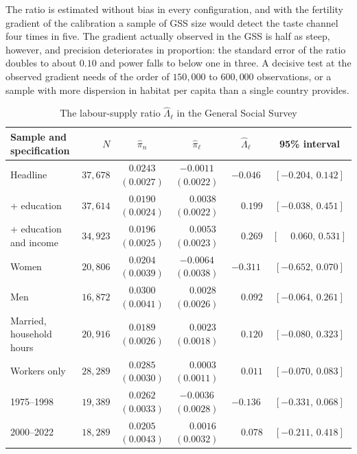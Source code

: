 \documentclass[11pt]{article}
\begin{document}
The ratio is estimated without bias in every configuration, and with the fertility gradient of the
calibration a sample of GSS size would detect the taste channel four times in five. The gradient
actually observed in the GSS is half as steep, however, and precision deteriorates in proportion:
the standard error of the ratio doubles to about $0.10$ and power falls to below one in three. A
decisive test at the observed gradient needs of the order of $150{,}000$ to $600{,}000$ observations, or a sample
with more dispersion in habitat per capita than a single country provides.

\begin{table}[h!]\centering
\begin{threeparttable}
\caption{The labour-supply ratio $\widehat\Lambda_\ell$ in the General Social Survey}
\label{tab:gss}
\footnotesize\setlength{\tabcolsep}{3.5pt}
\begin{tabular}{lrcccc}
\toprule
Sample and specification & $N$ & $\hat\pi_n$ & $\hat\pi_\ell$ & $\widehat\Lambda_\ell$ & 95\% interval\\
\midrule
Headline                              & $37{,}678$ & $0.0243$ $(0.0027)$ & $-0.0011$ $(0.0022)$ & $-0.046$ & $[-0.204,\,0.142]$\\
\quad + education                     & $37{,}614$ & $0.0190$ $(0.0024)$ & $\phantom{-}0.0038$ $(0.0022)$ & $\phantom{-}0.199$ & $[-0.038,\,0.451]$\\
\quad + education and income          & $34{,}923$ & $0.0196$ $(0.0025)$ & $\phantom{-}0.0053$ $(0.0023)$ & $\phantom{-}0.269$ & $[\phantom{-}0.060,\,0.531]$\\
Women                                 & $20{,}806$ & $0.0204$ $(0.0039)$ & $-0.0064$ $(0.0038)$ & $-0.311$ & $[-0.652,\,0.070]$\\
Men                                   & $16{,}872$ & $0.0300$ $(0.0041)$ & $\phantom{-}0.0028$ $(0.0026)$ & $\phantom{-}0.092$ & $[-0.064,\,0.261]$\\
Married, household hours              & $20{,}916$ & $0.0189$ $(0.0026)$ & $\phantom{-}0.0023$ $(0.0018)$ & $\phantom{-}0.120$ & $[-0.080,\,0.323]$\\
Workers only                          & $28{,}289$ & $0.0285$ $(0.0030)$ & $\phantom{-}0.0003$ $(0.0011)$ & $\phantom{-}0.011$ & $[-0.070,\,0.083]$\\
1975--1998                            & $19{,}389$ & $0.0262$ $(0.0033)$ & $-0.0036$ $(0.0028)$ & $-0.136$ & $[-0.331,\,0.068]$\\
2000--2022                            & $18{,}289$ & $0.0205$ $(0.0043)$ & $\phantom{-}0.0016$ $(0.0032)$ & $\phantom{-}0.078$ & $[-0.211,\,0.418]$\\

\end{tabular}
\end{threeparttable}
\end{table}
\end{document}
